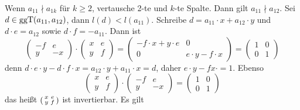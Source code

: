 Wenn $a_{11} \nmid a_{1k}$ für $k \ge 2$, vertausche 2-te und $k$-te Spalte. Dann gilt $a_{11} \nmid a_{12}$. Sei $d \in \operatorname{ggT}(a_{11}, a_{12})$,
dann $l(d) < l(a_{11})$. Schreibe $d = a_{11} \cdot x + a_{12} \cdot y$ und $d \cdot e = a_{12}$ sowie $ d \cdot f = - a_{11}$. Dann ist 
\[
	\begin{pmatrix}
		-f & e \\
		y & -x
	\end{pmatrix} \cdot \begin{pmatrix}
		x  & e \\
		y & f
	\end{pmatrix} = \begin{pmatrix}
		- f \cdot x + y \cdot e & 0 \\
		0 & e \cdot y - f \cdot x
	\end{pmatrix}
	= \begin{pmatrix}
		1 & 0 \\
		0 & 1
	\end{pmatrix}
\]
denn $d \cdot e \cdot y - d \cdot f \cdot x = a_{12} \cdot y + a_{11} \cdot x = d$, daher $e \cdot y- f x \cdot = 1$. Ebenso 
\[
	\begin{pmatrix}
		x & e \\
		y & f
	\end{pmatrix} \cdot \begin{pmatrix}
		- f & e \\
		y & -x
	\end{pmatrix} = \begin{pmatrix}
		1 & 0\\
		0 & 1
	\end{pmatrix}
\]
das heißt $\begin{psmallmatrix}
	x & e \\
	y & f
\end{psmallmatrix}$ ist invertierbar. Es gilt 

